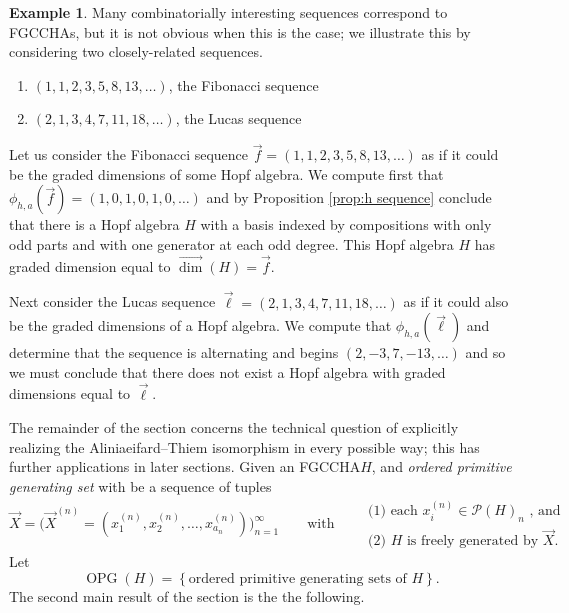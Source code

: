 \documentclass[11pt]{amsart}
\theoremstyle{definition}
\newtheorem{example}[theorem]{Example}
\numberwithin{equation}{section}
\newcommand{\FGCCHA}{\textsf{FGCCHA}\xspace}
\newcommand{\FGCCHAs}{\textsf{FGCCHA}s\xspace}
\newcommand{\vecdim}{\overrightarrow{\dim}}
\newcommand{\OPG}{\operatorname{OPG}}
\begin{document}
\begin{example}
Many combinatorially interesting sequences correspond to \FGCCHAs, but it is not obvious when this is the case; we illustrate this by considering two closely-related sequences.
\begin{enumerate}
\item $(1,1,2,3,5,8,13,\ldots)$, the Fibonacci sequence

\item $(2,1,3,4,7,11,18,\ldots)$, the Lucas sequence
\end{enumerate}
Let us consider the Fibonacci sequence $\vec{f} = (1,1,2,3,5,8,13,\ldots)$
as if it could be the graded dimensions of some Hopf algebra.
We compute first that $\phi_{h,a}(\vec{f}) = (1,0,1,0,1,0,\ldots)$
and by Proposition \ref{prop:h sequence} conclude
that there is a Hopf algebra $H$ with a basis indexed by
compositions with only odd parts and with one generator at each odd degree.
This Hopf algebra $H$ has graded dimension equal to $\vecdim(H) = \vec{f}$.

Next consider the Lucas sequence $\vec{\ell} = (2,1,3,4,7,11,18,\ldots)$
as if it could also be the graded dimensions of a Hopf algebra.  We compute that $\phi_{h,a}(\vec{\ell})$ and determine
that the sequence is alternating and begins $(2, -3, 7, -13,\ldots)$ and so we must conclude
that there does not exist a Hopf algebra with graded dimensions equal to $\vec{\ell}$.
\end{example}

The remainder of the section concerns the technical question of explicitly realizing the Aliniaeifard--Thiem isomorphism in every possible way; this has further applications in later sections.
Given an \FGCCHA $H$, and \emph{ordered primitive generating set} with be a sequence of tuples 
\[
\vec{X} = \Big(\vec{X}^{(n)} = (x_{1}^{(n)}, x_{2}^{(n)}, \ldots, x_{a_{n}}^{(n)})\Big)_{n = 1}^{\infty}
\qquad\text{with}\qquad
\begin{array}{l}
\text{(1) each $x_{i}^{(n)} \in \mathcal{P}(H)_{n}$ , and} \\
\text{(2) $H$ is freely generated by $\vec{X}$.}
\end{array}
\]
Let
\[
\OPG(H) = \left\{ \text{ordered primitive generating sets of $H$} \right\}.
\]
The second main result of the section is the the following.
\end{document}
